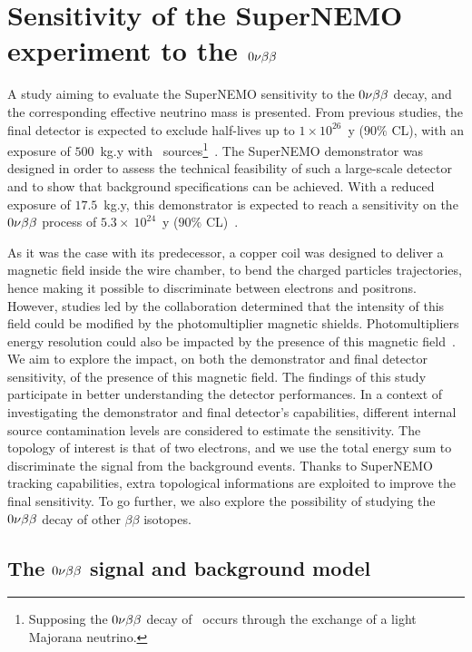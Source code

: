 \chapter{Sensitivity of the SuperNEMO experiment to the $0\nu\beta\beta$}
\label{ch:sensitivity}

A study aiming to evaluate the SuperNEMO sensitivity to the $0\nu\beta\beta$ decay, and the corresponding effective neutrino mass is presented.
From previous studies, the final detector is expected to exclude half-lives up to $1\times 10^{26}$~y ($90\%$ CL), with an exposure of $500$~kg.y with \Se\ sources\footnote{Supposing the $0\nu\beta\beta$ decay of \Se\ occurs through the exchange of a light Majorana neutrino.}~\cite{art:SuperNEMO2010}.
The SuperNEMO demonstrator was designed in order to assess the technical feasibility of such a large-scale detector and to show that background specifications can be achieved.
With a reduced exposure of $17.5$~kg.y, this demonstrator is expected to reach a sensitivity on the $0\nu\beta\beta$ process of $5.3\times~10^{24}$~y ($90\%$ CL)~\cite{CalvezThesis}.

As it was the case with its predecessor, a copper coil was designed to deliver a magnetic field inside the wire chamber, to bend the charged particles trajectories, hence making it possible to discriminate between electrons and positrons.
However, studies led by the collaboration determined that the intensity of this field could be modified by the photomultiplier magnetic shields.
Photomultipliers energy resolution could also be impacted by the presence of this magnetic field~\cite{CalvezThesis,internal:magnetic_field}.
We aim to explore the impact, on both the demonstrator and final detector sensitivity, of the presence of this magnetic field.
The findings of this study participate in better understanding the detector performances.
In a context of investigating the demonstrator and final detector's capabilities, different internal source contamination levels are considered to estimate the sensitivity.
The topology of interest is that of two electrons, and we use the total energy sum to discriminate the signal from the background events.
Thanks to SuperNEMO tracking capabilities, extra topological informations are exploited to improve the final sensitivity.
To go further, we also explore the possibility of studying the $0\nu\beta\beta$ decay of other $\beta\beta$ isotopes.

\section{The $0\nu\beta\beta$ signal and background model}
\label{sec:sensitivity_simus}

